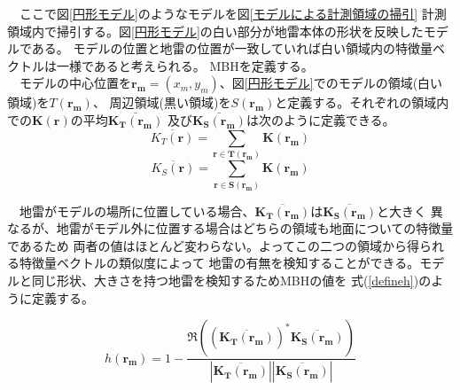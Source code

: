 \documentclass[12pt,a4paper]{jsreport}
\begin{document}
    　ここで図\ref{円形モデル}のようなモデルを図\ref{モデルによる計測領域の掃引}
    計測領域内で掃引する。図\ref{円形モデル}の白い部分が地雷本体の形状を反映したモデルである。
    モデルの位置と地雷の位置が一致していれば白い領域内の特徴量ベクトルは一様であると考えられる。
    MBHを定義する。
    \\　モデルの中心位置を$\bm{r_m}=(x_{m},y_{m})$、図\ref{円形モデル}でのモデルの領域(白い領域)を$T(\bm{r_m})$、
    周辺領域(黒い領域)を$S(\bm{r_m})$と定義する。それぞれの領域内での$\bm{K(\bm{r})}$の平均$\bar{\bm{K_T(\bm{r_m})}}$
    及び$\bar{\bm{K_S(\bm{r_m})}}$は次のように定義できる。
    \begin{equation}
      \overline{K_T(\bm{r})} =
          \sum_{\bm{r}\in \bm{T(\bm{r_m})} } \bm{K(\bm{r_m})}
          \label{KT}
      \end{equation}
      \begin{equation}
        \overline{K_S(\bm{r})} =
            \sum_{\bm{r}\in \bm{S(\bm{r_m})} }\bm{K(\bm{r_m})}
            \label{KS}
        \end{equation}

    　地雷がモデルの場所に位置している場合、$\overline{\bm{K_T(\bm{r_m})}}$は$\overline{\bm{K_S(\bm{r_m})}}$と大きく
    異なるが、地雷がモデル外に位置する場合はどちらの領域も地面についての特徴量であるため
    両者の値はほとんど変わらない。よってこの二つの領域から得られる特徴量ベクトルの類似度によって
    地雷の有無を検知することができる。モデルと同じ形状、大きさを持つ地雷を検知するためMBHの値を
    式(\ref{defineh})のように定義する。


    \begin{equation}
      {h(\bm{r_m})} = 
      1-\frac{\Re( (\overline{\bm{K_T(\bm{r_m})}})^{*} \overline{\bm{K_S(\bm{r_m})}})}
      {|\overline{\bm{K_T(\bm{r_m})}}||\overline{\bm{K_S(\bm{r_m})}}|}
          \label{defineh}
      \end{equation}
      
\end{document}
